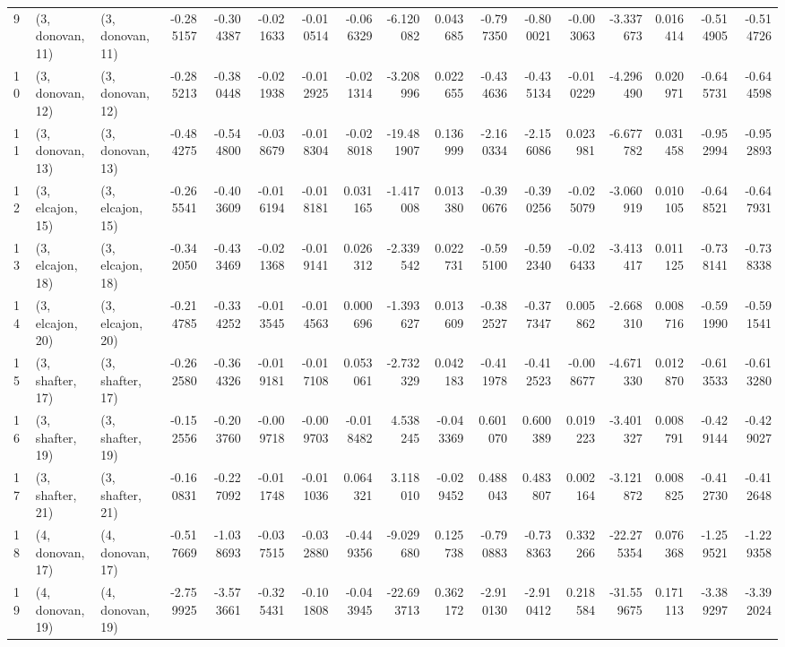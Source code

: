 \begin{tabular}{lllrrrrrrrrrrrrrr}
9  &  (3, donovan, 11) &  (3, donovan, 11) & -0.285157 & -0.304387 &  -0.021633 & -0.010514 & -0.066329 &  -6.120082 &  0.043685 &  -0.797350 & -0.800021 & -0.003063 &  -3.337673 &  0.016414 & -0.514905 & -0.514726 \\
10 &  (3, donovan, 12) &  (3, donovan, 12) & -0.285213 & -0.380448 &  -0.021938 & -0.012925 & -0.021314 &  -3.208996 &  0.022655 &  -0.434636 & -0.435134 & -0.010229 &  -4.296490 &  0.020971 & -0.645731 & -0.644598 \\
11 &  (3, donovan, 13) &  (3, donovan, 13) & -0.484275 & -0.544800 &  -0.038679 & -0.018304 & -0.028018 & -19.481907 &  0.136999 &  -2.160334 & -2.156086 &  0.023981 &  -6.677782 &  0.031458 & -0.952994 & -0.952893 \\
12 &  (3, elcajon, 15) &  (3, elcajon, 15) & -0.265541 & -0.403609 &  -0.016194 & -0.018181 &  0.031165 &  -1.417008 &  0.013380 &  -0.390676 & -0.390256 & -0.025079 &  -3.060919 &  0.010105 & -0.648521 & -0.647931 \\
13 &  (3, elcajon, 18) &  (3, elcajon, 18) & -0.342050 & -0.433469 &  -0.021368 & -0.019141 &  0.026312 &  -2.339542 &  0.022731 &  -0.595100 & -0.592340 & -0.026433 &  -3.413417 &  0.011125 & -0.738141 & -0.738338 \\
14 &  (3, elcajon, 20) &  (3, elcajon, 20) & -0.214785 & -0.334252 &  -0.013545 & -0.014563 &  0.000696 &  -1.393627 &  0.013609 &  -0.382527 & -0.377347 &  0.005862 &  -2.668310 &  0.008716 & -0.591990 & -0.591541 \\
15 &  (3, shafter, 17) &  (3, shafter, 17) & -0.262580 & -0.364326 &  -0.019181 & -0.017108 &  0.053061 &  -2.732329 &  0.042183 &  -0.411978 & -0.412523 & -0.008677 &  -4.671330 &  0.012870 & -0.613533 & -0.613280 \\
16 &  (3, shafter, 19) &  (3, shafter, 19) & -0.152556 & -0.203760 &  -0.009718 & -0.009703 & -0.018482 &   4.538245 & -0.043369 &   0.601070 &  0.600389 &  0.019223 &  -3.401327 &  0.008791 & -0.429144 & -0.429027 \\
17 &  (3, shafter, 21) &  (3, shafter, 21) & -0.160831 & -0.227092 &  -0.011748 & -0.011036 &  0.064321 &   3.118010 & -0.029452 &   0.488043 &  0.483807 &  0.002164 &  -3.121872 &  0.008825 & -0.412730 & -0.412648 \\
18 &  (4, donovan, 17) &  (4, donovan, 17) & -0.517669 & -1.038693 &  -0.037515 & -0.032880 & -0.449356 &  -9.029680 &  0.125738 &  -0.790883 & -0.738363 &  0.332266 & -22.275354 &  0.076368 & -1.259521 & -1.229358 \\
19 &  (4, donovan, 19) &  (4, donovan, 19) & -2.759925 & -3.573661 &  -0.325431 & -0.101808 & -0.043945 & -22.693713 &  0.362172 &  -2.910130 & -2.910412 &  0.218584 & -31.559675 &  0.171113 & -3.389297 & -3.392024 \\

\end{tabular}
